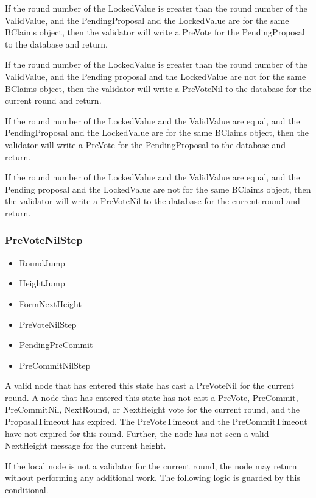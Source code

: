 If the round number of the LockedValue is greater than the round number
of the ValidValue, and the PendingProposal and the LockedValue are for
the same BClaims object, then the validator will write a PreVote for
the PendingProposal to the database and return.

If the round number of the LockedValue is greater than the round number
of the ValidValue, and the Pending proposal and the LockedValue are not
for the same BClaims object, then the validator will write a PreVoteNil
to the database for the current round and return.

If the round number of the LockedValue and the ValidValue are equal,
and the PendingProposal and the LockedValue are for the same BClaims
object, then the validator will write a PreVote for the PendingProposal
to the database and return.

If the round number of the LockedValue and the ValidValue are equal,
and the Pending proposal and the LockedValue are not for the same
BClaims object, then the validator will write a PreVoteNil to the
database for the current round and return.


\subsubsection{PreVoteNilStep}

\begin{itemize}
    \item RoundJump
    \item HeightJump
    \item FormNextHeight
    \item PreVoteNilStep
    \item PendingPreCommit
    \item PreCommitNilStep
\end{itemize}

A valid node that has entered this state has cast a PreVoteNil for the
current round.
A node that has entered this state has not cast a PreVote, PreCommit,
PreCommitNil, NextRound, or NextHeight vote for the current round, and
the ProposalTimeout has expired.
The PreVoteTimeout and the PreCommitTimeout have not expired for this
round.
Further, the node has not seen a valid NextHeight message for the
current height.

If the local node is not a validator for the current round, the node
may return without performing any additional work.
The following logic is guarded by this conditional.


